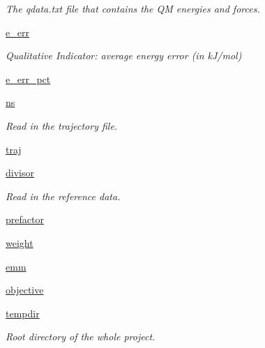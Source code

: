 \begin{DoxyCompactItemize}
\begin{DoxyCompactList}\small\item\em \-The qdata.\-txt file that contains the \-Q\-M energies and forces. \end{DoxyCompactList}\item 
\hyperlink{classforcebalance_1_1interaction_1_1Interaction_a761d881eba96250a912eb1a4d18ae511}{e\-\_\-err}
\begin{DoxyCompactList}\small\item\em \-Qualitative \-Indicator\-: average energy error (in k\-J/mol) \end{DoxyCompactList}\item 
\hyperlink{classforcebalance_1_1interaction_1_1Interaction_a7422ae23c535b5f0b265997276cda48f}{e\-\_\-err\-\_\-pct}
\item 
\hyperlink{classforcebalance_1_1interaction_1_1Interaction_ac1f6c5f3016ee6c1e7f847a61326e984}{ns}
\begin{DoxyCompactList}\small\item\em \-Read in the trajectory file. \end{DoxyCompactList}\item 
\hyperlink{classforcebalance_1_1interaction_1_1Interaction_a3deec07ef2fea43d2282c0a2831e3a53}{traj}
\item 
\hyperlink{classforcebalance_1_1interaction_1_1Interaction_a5acc08fd127025be41f07108089c6ad0}{divisor}
\begin{DoxyCompactList}\small\item\em \-Read in the reference data. \end{DoxyCompactList}\item 
\hyperlink{classforcebalance_1_1interaction_1_1Interaction_a3f8576282adfd82b056b20a3d930c022}{prefactor}
\item 
\hyperlink{classforcebalance_1_1interaction_1_1Interaction_a44f014dd322e410a37dd453f99d879ba}{weight}
\item 
\hyperlink{classforcebalance_1_1interaction_1_1Interaction_ae8e2bf3b78d9f44929f7f50dcf90b1db}{emm}
\item 
\hyperlink{classforcebalance_1_1interaction_1_1Interaction_a60e39bdee6c2aea725be0cc1c232a47e}{objective}
\item 
\hyperlink{classforcebalance_1_1target_1_1Target_aede2856573b890cd47054ad36937d6f6}{tempdir}
\begin{DoxyCompactList}\small\item\em \-Root directory of the whole project. \end{DoxyCompactList}\item 

\end{DoxyCompactItemize}

